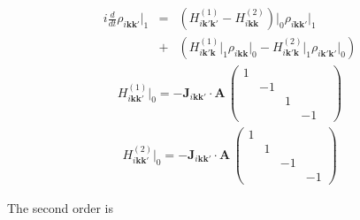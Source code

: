 \documentclass[aps,prb,reprint,noeprint,superscriptaddress]{revtex4-1}
\begin{document}
\begin{eqnarray*}
i\frac{d}{dt} \rho_{i\mathbf{k}\mathbf{k}'}\big|_1
  &=&
  \left( 
    H_{i\mathbf{k}' \mathbf{k'}}^{(1)} 
    -
    H_{i\mathbf{kk}}^{(2)}
  \right)\bigg|_0
    \rho_{i\mathbf{kk'}}\big|_1
    \\
  &+&
  \left(
    H_{i\mathbf{k}' \mathbf{k}}^{(1)}\big|_1 \rho_{i\mathbf{kk}}\big|_0 
    -
    H_{i\mathbf{k'k}}^{(2)}\big|_1
    \rho_{i\mathbf{k'k'}}\big|_0
  \right)
\end{eqnarray*}
\begin{eqnarray*}
  H_{i\mathbf{kk'}}^{(1)}\big|_0
  =
  -\mathbf{J}_{i\mathbf{kk'}} \cdot \mathbf{A} \,
  \begin{pmatrix}
    1 &  & & \\
     & -1 & & \\
    && 1 &  \\
    &&  & -1& 
  \end{pmatrix}
\end{eqnarray*}
\begin{eqnarray*}
  H_{i\mathbf{kk'}}^{(2)}\big|_0
  =
  -\mathbf{J}_{i\mathbf{kk'}} \cdot \mathbf{A} \,
  \begin{pmatrix}
    1 &&  & \\
    & 1 &&  \\
     && -1 & \\
    &  &&-1 
  \end{pmatrix}
\end{eqnarray*}

The second order is
\end{document}
